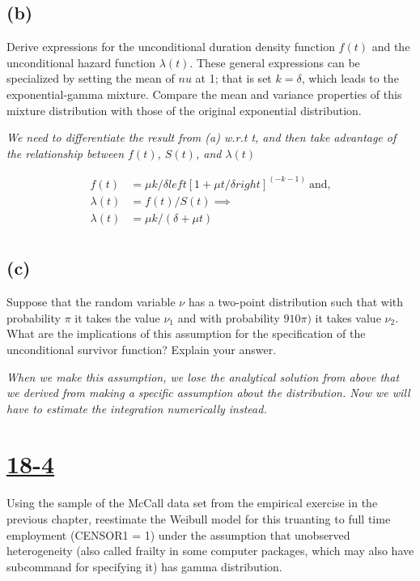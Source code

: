 \documentclass[11pt]{article}
\theoremstyle{definition}
\begin{document}
\subsection*{(b)} 
Derive expressions for the unconditional duration density function $f(t)$ and the unconditional hazard function $\lambda (t)$.  These general expressions can be specialized by setting the mean of $nu$ at 1; that is set $k=\delta$, which leads to the exponential-gamma mixture.  Compare the mean and variance properties of this mixture distribution with those of the original exponential distribution.  

\textit{We need to differentiate the result from (a) w.r.t t, and then take advantage of the relationship between $f(t)$, $S(t)$, and $\lambda(t)$} 

\begin{equation*}
\begin{split}
f(t) & = \mu k / \delta left[1 + \mu t / \delta right]^(-k-1) \ \text{and,} \\
\lambda(t) & = f(t) / S(t) \implies \\
\lambda(t) & = \mu k / (\delta + \mu t) \\
\end{split}
\end{equation*}

\subsection*{(c)} 
Suppose that the random variable $\nu$ has a two-point distribution such that with probability $\pi$ it takes the value $\nu_1$ and with probability $910\pi)$ it takes value $\nu_2$.  What are the implications of this assumption for the specification of the unconditional survivor function?  Explain your answer.  

\textit{When we make this assumption, we lose the analytical solution from above that we derived from making a specific assumption about the distribution.  Now we will have to estimate the integration numerically instead.} 

\section*{\underline{18-4}} 
Using the sample of the McCall data set from the empirical exercise in the previous chapter, reestimate the Weibull model for this truanting to full time employment (CENSOR1 = 1) under the assumption that unobserved heterogeneity (also called frailty in some computer packages, which may also have subcommand for specifying it) has gamma distribution.  
\end{document}
